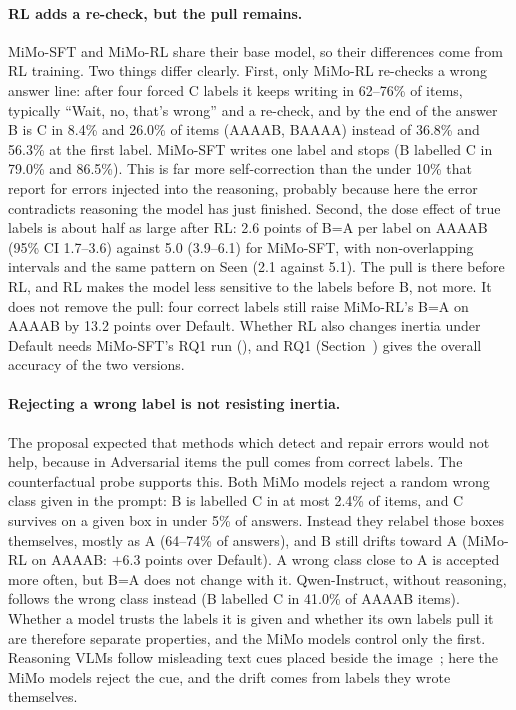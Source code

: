 \paragraph{RL adds a re-check, but the pull remains.} MiMo-SFT and MiMo-RL share their base model,
so their differences come from RL training. Two things differ clearly. First, only MiMo-RL
re-checks a wrong answer line: after four forced C labels it keeps writing in 62--76\% of items,
typically ``Wait, no, that's wrong'' and a re-check, and by the end of the answer B is C in 8.4\% and
26.0\% of items (AAAAB, BAAAA) instead of 36.8\% and 56.3\% at the first label. MiMo-SFT writes one label and stops (B labelled C in 79.0\% and
86.5\%). This is far more self-correction than the under 10\% that \citet{zhu2026textualinertia}
report for errors injected into the reasoning, probably because here the error contradicts reasoning
the model has just finished. Second, the dose effect of true labels is about half as large after RL:
2.6 points of B=A per label on AAAAB (95\% CI 1.7--3.6) against 5.0 (3.9--6.1) for MiMo-SFT, with
non-overlapping intervals and the same pattern on Seen (2.1 against 5.1). The pull is there before
RL, and RL makes the model less sensitive to the labels before B, not more. It does not remove the
pull: four correct labels still raise MiMo-RL's B=A on AAAAB by 13.2 points over Default. Whether
RL also changes inertia under Default needs MiMo-SFT's RQ1 run (\tbd), and RQ1 (Section~\tbd) gives
the overall accuracy of the two versions.

\paragraph{Rejecting a wrong label is not resisting inertia.} The proposal expected that methods
which detect and repair errors would not help, because in Adversarial items the pull comes from
correct labels. The counterfactual probe supports this. Both MiMo models reject a random wrong class
given in the prompt: B is labelled C in at most 2.4\% of items, and C survives on a given box in
under 5\% of answers. Instead they relabel those boxes themselves, mostly as A (64--74\% of answers),
and B still drifts toward A (MiMo-RL on AAAAB: $+6.3$ points over Default). A wrong class close to A
is accepted more often, but B=A does not change with it. Qwen-Instruct, without reasoning, follows
the wrong class instead (B labelled C in 41.0\% of AAAAB items). Whether a model trusts the labels
it is given and whether its own labels pull it are therefore separate properties, and the MiMo models
control only the first. Reasoning VLMs follow misleading text cues placed beside the
image~\citep{sanchezvillegas2026reasoning}; here the MiMo models reject the cue, and the drift comes
from labels they wrote themselves.


